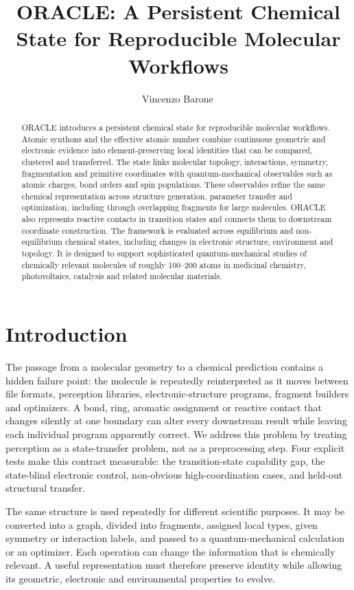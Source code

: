 \documentclass[journal=jctcce,manuscript=article]{achemso}
\title{ORACLE: A Persistent Chemical State for Reproducible Molecular Workflows}
\author{Vincenzo Barone\,\orcidlink{0000-0001-6420-4107}}
\affiliation[c]{Consorzio Interuniversitario Nazionale per la Scienza e
Tecnologia dei Materiali (INSTM), via G. Giusti 9, 50121 Firenze, Italy}
\begin{document}
\setlength{\emergencystretch}{1em}

\begin{abstract}
ORACLE introduces a persistent chemical state for reproducible molecular
workflows.  Atomic synthons and the effective atomic number combine continuous
geometric and electronic evidence into element-preserving local identities that
can be compared, clustered and transferred.  The state links molecular
topology, interactions, symmetry, fragmentation and primitive coordinates with
quantum-mechanical observables such as atomic charges, bond orders and spin
populations.  These observables refine the same chemical representation across
structure generation, parameter transfer and optimization, including through
overlapping fragments for large molecules.  ORACLE also represents reactive
contacts in transition states and connects them to downstream coordinate
construction.  The framework is evaluated across equilibrium and
non-equilibrium chemical states, including changes in electronic structure,
environment and topology.  It is
designed to support sophisticated quantum-mechanical studies of chemically
relevant molecules of roughly 100--200 atoms in medicinal chemistry,
photovoltaics, catalysis and related molecular materials.
\end{abstract}

\section{Introduction}

The passage from a molecular geometry to a chemical prediction contains a
hidden failure point: the molecule is repeatedly reinterpreted as it moves
between file formats, perception libraries, electronic-structure programs,
fragment builders and optimizers.  A bond, ring, aromatic assignment or
reactive contact that changes silently at one boundary can alter every
downstream result while leaving each individual program apparently correct.
We address this problem by treating perception as a state-transfer problem,
not as a preprocessing step.  Four explicit tests make this contract
measurable: the transition-state capability gap, the state-blind electronic
control, non-obvious high-coordination cases, and held-out structural transfer.

The same structure is used repeatedly for different scientific purposes.  It
may be converted into a graph, divided into fragments, assigned local types,
given symmetry or interaction labels, and passed to a quantum-mechanical
calculation or an optimizer.  Each operation can change the information that
is chemically relevant.  A useful representation must therefore preserve
identity while allowing its geometric, electronic and environmental
properties to evolve.
\end{document}
